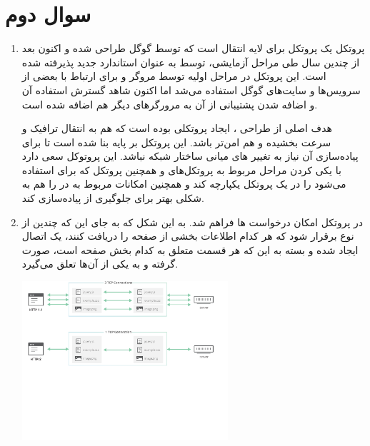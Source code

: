 \documentclass[12pt]{article}
\begin{document}
\section{سوال دوم}

\begin{enumerate}
	\item 
	پروتکل  یک پروتکل برای لایه انتقال است که توسط گوگل طراحی شده و  اکنون بعد از چندین سال طی مراحل آزمایشی، توسط  به عنوان استاندارد جدید پذیرفته شده است. این پروتکل در مراحل اولیه توسط مروگر  و برای ارتباط با بعضی از سرویس‌ها و سایت‌های گوگل استفاده می‌شد اما اکنون شاهد گسترش استفاده آن و اضافه شدن پشتیبانی از آن به مرورگرهای دیگر هم اضافه شده است.
	
	هدف اصلی از طراحی ، ایجاد پروتکلی بوده است که هم به انتقال ترافیک  و  سرعت بخشیده و هم امن‌تر باشد. این پروتکل بر پایه  بنا شده است تا برای پیاده‌سازی آن نیاز به تغییر  های میانی ساختار شبکه نباشد. این پروتوکل سعی دارد با یکی کردن مراحل مربوط به  پروتکل‌های  و همچنین پروتکل  که برای  استفاده می‌شود را در یک پروتکل یکپارچه کند و همچنین امکانات مربوط به  در  را هم به شکلی بهتر برای جلوگیری از  پیاده‌سازی کند.
	
	\item
	
	در پروتکل  امکان  درخواست ها فراهم شد. به این شکل که به جای این که چندین  از نوع  برقرار شود که هر کدام اطلاعات بخشی از صفحه را دریافت کنند، یک اتصال  ایجاد شده و بسته به این که هر قسمت متعلق به کدام بخش صفحه است،  صورت گرفته و به یکی از آن‌ها تعلق می‌گیرد.
	
	\begin{center}
		
		\includegraphics[width = 0.6\textwidth , trim=0 200 0 0]{images/multiplexing.pdf}
	\end{center}
	

\end{enumerate}
\end{document}
